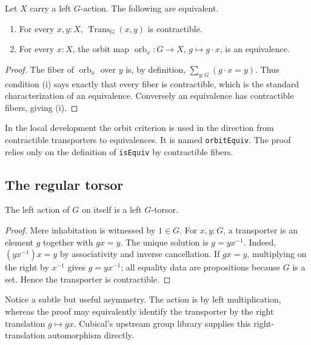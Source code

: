\begin{proposition}
Let $X$ carry a left $G$-action. The following are equivalent.
\begin{enumerate}[label=\textup{(\roman*)}]
\item For every $x,y:X$, $\operatorname{Trans}_G(x,y)$ is contractible.
\item For every $x:X$, the orbit map $\operatorname{orb}_x:G\to X$, $g\mapsto g\cdot x$, is an equivalence.
\end{enumerate}
\end{proposition}
\begin{proof}
The fiber of $\operatorname{orb}_x$ over $y$ is, by definition,
$\sum_{g:G}(g\cdot x=y)$. Thus condition (i) says exactly that every fiber is contractible, which is the standard characterization of an equivalence. Conversely an equivalence has contractible fibers, giving (i).
\end{proof}

\begin{remark}
In the local development the orbit criterion is used in the direction from contractible transporters to equivalences. It is named \texttt{orbitEquiv}. The proof relies only on the definition of \texttt{isEquiv} by contractible fibers.
\end{remark}


\subsection{The regular torsor}
\begin{proposition}
The left action of $G$ on itself is a left $G$-torsor.
\end{proposition}
\begin{proof}
Mere inhabitation is witnessed by $1\in G$. For $x,y:G$, a transporter is an element $g$ together with $gx=y$. The unique solution is $g=yx^{-1}$. Indeed, $(yx^{-1})x=y$ by associativity and inverse cancellation. If $gx=y$, multiplying on the right by $x^{-1}$ gives $g=yx^{-1}$; all equality data are propositions because $G$ is a set. Hence the transporter is contractible.
\end{proof}

Notice a subtle but useful asymmetry. The action is by left multiplication, whereas the proof may equivalently identify the transporter by the right translation $g\mapsto gx$. Cubical's upstream group library supplies this right-translation automorphism directly.

